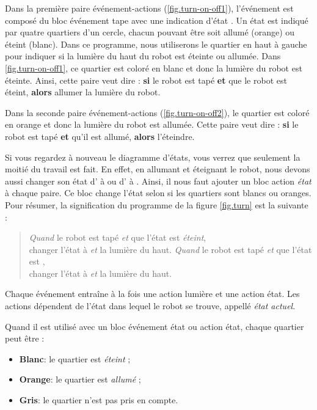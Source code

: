 Dans la première paire événement-actions (\cref{fig.turn-on-off1}), l'événement est composé du bloc événement tape avec une indication d'état .
Un état est indiqué par quatre quartiers d'un cercle, chacun pouvant être soit allumé (orange) ou éteint (blanc).
Dans ce programme, nous utiliserons le quartier en haut à gauche pour indiquer si la lumière du haut du robot est éteinte ou allumée.
Dans \cref{fig.turn-on-off1}, ce quartier est coloré en blanc
et donc la lumière du robot est éteinte.
Ainsi, cette paire veut dire : \textbf{si} le robot est tapé \textbf{et} que le robot est éteint, \textbf{alors} allumer la lumière du robot.

Dans la seconde paire événement-actions
(\cref{fig.turn-on-off2}),
le quartier est coloré en orange et donc la lumière du robot est allumée.
Cette paire veut dire : \textbf{si} le robot est tapé \textbf{et} qu'il est allumé, \textbf{alors} l'éteindre.

Si vous regardez à nouveau le diagramme d'états, vous verrez que seulement la moitié du travail est fait.
En effet, en allumant et éteignant le robot, nous devons aussi changer son état d' à  ou d' à .
Ainsi, il nous faut ajouter un bloc action \emph{état}  à chaque paire.
Ce bloc change l'état selon si les quartiers sont blancs ou oranges.
Pour résumer, la signification du programme de la figure \cref{fig.turn} est la suivante :

\begin{quote}
    \emph{Quand} le robot est tapé \emph{et} que l'état est \emph{éteint},\\ changer l'état à  \emph{et}  la lumière du haut.
    \emph{Quand} le robot est tapé \emph{et} que l'état est ,\\changer l'état à 
    \emph{et}  la lumière du haut.
\end{quote}

Chaque événement entraîne à la fois une action lumière et une action état.
Les actions dépendent de l'état dans lequel le robot se trouve, appellé \emph{état actuel}.


Quand il est utilisé avec un bloc événement état ou action état, chaque quartier peut être :
\begin{itemize}
	\item \textbf{Blanc}: le quartier est \emph{éteint} ;
	\item \textbf{Orange}: le quartier est \emph{allumé} ;
	\item \textbf{Gris}: le quartier n'est pas pris en compte.
\end{itemize}

